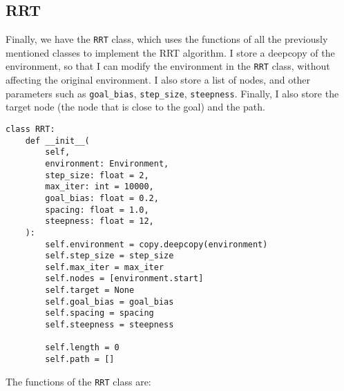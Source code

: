 \documentclass[12pt]{report}
\begin{document}
\subsection{RRT}

Finally, we have the \texttt{RRT} class, which uses the functions of all the previously mentioned classes to implement the RRT algorithm. I store a deepcopy of the environment, so that I can modify the environment in the \texttt{RRT} class, without affecting the original environment. I also store a list of nodes, and other parameters such as \texttt{goal\_bias}, \texttt{step\_size}, \texttt{steepness}. Finally, I also store the target node (the node that is close to the goal) and the path.

\begin{lstlisting}[caption={RRT Class}]
class RRT:
    def __init__(
        self,
        environment: Environment,
        step_size: float = 2,
        max_iter: int = 10000,
        goal_bias: float = 0.2,
        spacing: float = 1.0,
        steepness: float = 12,
    ):
        self.environment = copy.deepcopy(environment)
        self.step_size = step_size
        self.max_iter = max_iter
        self.nodes = [environment.start]
        self.target = None
        self.goal_bias = goal_bias
        self.spacing = spacing
        self.steepness = steepness

        self.length = 0
        self.path = []
\end{lstlisting}

The functions of the \texttt{RRT} class are:
\end{document}
